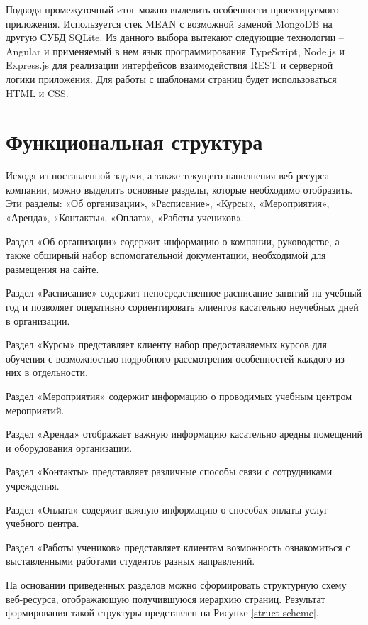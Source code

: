 Подводя промежуточный итог можно выделить особенности проектируемого приложения.
Используется стек MEAN с возможной заменой MongoDB на другую СУБД SQLite.
Из данного выбора вытекают следующие технологии -- Angular и применяемый в нем язык программирования TypeScript, Node.js и Express.js для реализации интерфейсов взаимодействия REST и серверной логики приложения.
Для работы с шаблонами страниц будет использоваться HTML и CSS.

\clearpage
\section{Функциональная структура}

Исходя из поставленной задачи, а также текущего наполнения веб-ресурса компании, можно выделить основные разделы, которые необходимо отобразить.
Эти разделы: «Об организации», «Расписание», «Курсы», «Мероприятия», «Аренда», «Контакты», «Оплата», «Работы учеников».

Раздел «Об организации» содержит информацию о компании, руководстве, а также обширный набор вспомогательной документации, необходимой для размещения на сайте.

Раздел «Расписание» содержит непосредственное расписание занятий на учебный год и позволяет оперативно сориентировать клиентов касательно неучебных дней в организации.

Раздел «Курсы» представляет клиенту набор предоставляемых курсов для обучения с возможностью подробного рассмотрения особенностей каждого из них в отдельности.

Раздел «Мероприятия» содержит информацию о проводимых учебным центром мероприятий.

Раздел «Аренда» отображает важную информацию касательно аредны помещений и оборудования организации.

Раздел «Контакты» представляет различные способы связи с сотрудниками учреждения.

Раздел «Оплата» содержит важную информацию о способах оплаты услуг учебного центра.

Раздел «Работы учеников» представляет клиентам возможность ознакомиться с выставленными работами студентов разных направлений.

На основании приведенных разделов можно сформировать структурную схему веб-ресурса, отображающую получившуюся иерархию страниц.
Результат формирования такой структуры представлен на Рисунке \ref{struct-scheme}.


